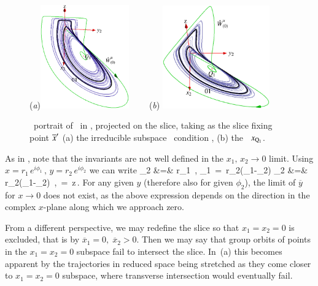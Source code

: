 \documentclass[final,number,sort&compress]{elsarticle}
\begin{document}
%
\begin{figure}[ht]
\begin{center}
  (\textit{a})\includegraphics[width=0.34\textwidth,clip=true]{CLEcoord245}
 ~~~~(\textit{b})
\includegraphics[width=0.41\textwidth,clip=true]{CLEperpReqb}
\end{center}
\caption{
\Statesp\ portrait of \cLf\ in \reducedsp, projected on the
slice, taking as the slice fixing point ${\overline{x}'}$
(a) the irreducible subspace \slice\ condition ,
(b) the \reqv\ $x_{\mathrm{Q}_{1}}$.
}
\label{fig:CLEmf}
\end{figure}


As in , note that the in\-vari\-ants
are not well defined in the $x_1,\,x_2 \to 0$ limit.
Using $x=r_1\, e^{i\phi_1}\,,\, y=r_2\, e^{i\phi_2}$ we can write
\bea
	  _2 &=& r_1 \,,\qquad
	  _1 \,=\, r_2\sin(\phi_1-\phi_2)\continue
	  _2 &=& r_2\cos(\phi_1-\phi_2) \,,\qquad	
	   \,=\, z\,.
	  \label{eq:invLaserPolar}
\eea
For any given $y$ (therefore also for given $\phi_2$), the
limit of $\overline{y}$ for $x \rightarrow 0$ does not exist,
as the above expression depends on the direction in the
complex $x$-plane along which we approach zero.

From a different perspective, we may redefine the slice so
that $x_1=x_2=0$ is excluded, that is by
$\overline{x}_1=0,\;\overline{x}_2>0$. Then we may say that
group orbits of points in the $x_1=x_2=0$ subspace fail to
intersect the slice. In \,(a) this becomes
apparent by the trajectories in reduced space being stretched
as they come closer to $x_1=x_2=0$ subspace, where transverse
intersection would eventually fail.
\end{document}
